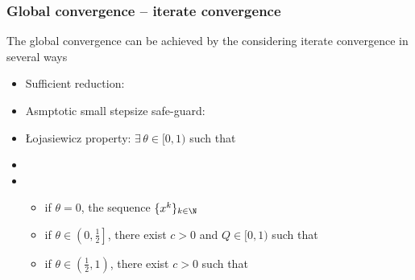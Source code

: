 	\subsubsection{Global convergence -- iterate convergence}
The global convergence can be achieved by the considering iterate convergence in several ways
	\begin{itemize}	
		\item {\color{blue} Sufficient reduction:}
		\vspace{-1mm}
		\vspace{-8mm}
		\item {\color{blue} Asmptotic small stepsize safe-guard:}
		\vspace{-1mm}
		\vspace{-8mm}
		\item {\color{blue}\L{}ojasiewicz property:} {$\exists\, \theta\in[0,1)$ such that}
		\vspace{-1mm}
		\vspace{-6mm}
		\item {}  
		\item {}
		\begin{itemize}
			\item if $\theta = 0$, the sequence $\{x^k\}_{k\in\N}$ \\[1mm]
			\item if $\theta \in \left(0,\frac{1}{2}\right]$, there exist $c>0$ and $Q\in[0,1)$
			such that
			\\[1mm]
			\item if $\theta \in \left(\frac{1}{2},1\right)$, there exist $c>0$ such that
		\end{itemize}
	\end{itemize}



